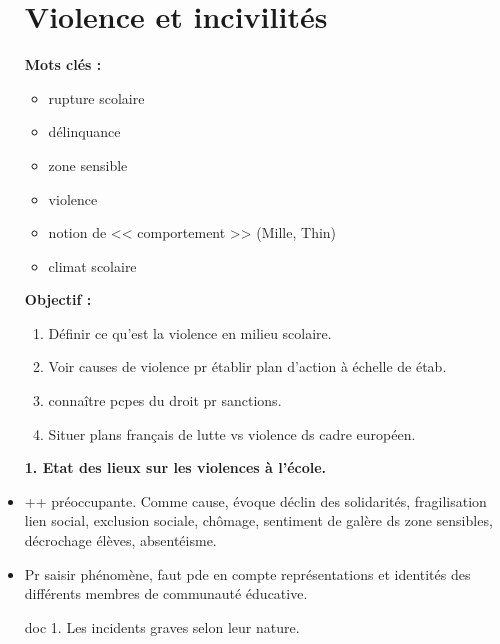 \documentclass[12pt]{report}
\begin{document}
\begin{itemize}



\chapter{Violence et incivilités}

\textbf{Mots clés : }
\begin{itemize}
\item rupture scolaire
\item délinquance
\item zone sensible
\item violence
\item notion de << comportement >> (Mille, Thin)
\item climat scolaire
\end{itemize}

\vspace{0.5cm}

\textbf{Objectif :}


\begin{enumerate}
\item Définir ce qu'est la violence en milieu scolaire.\\
\item Voir causes de violence pr établir plan d'action à échelle de étab.\\
\item connaître pcpes du droit pr sanctions. \\
\item Situer plans français de lutte vs violence ds cadre européen.\\
\end{enumerate}

\textbf{1. Etat des lieux sur les violences à l'école.}

\item ++ préoccupante. Comme cause, évoque déclin des solidarités, fragilisation lien social, exclusion sociale, chômage, sentiment de galère ds zone sensibles, décrochage élèves, absentéisme. \\

\item Pr saisir phénomène, faut pde en compte représentations et identités des différents membres de communauté éducative.

doc 1. Les incidents graves selon leur nature.


\end{itemize}
\end{document}
